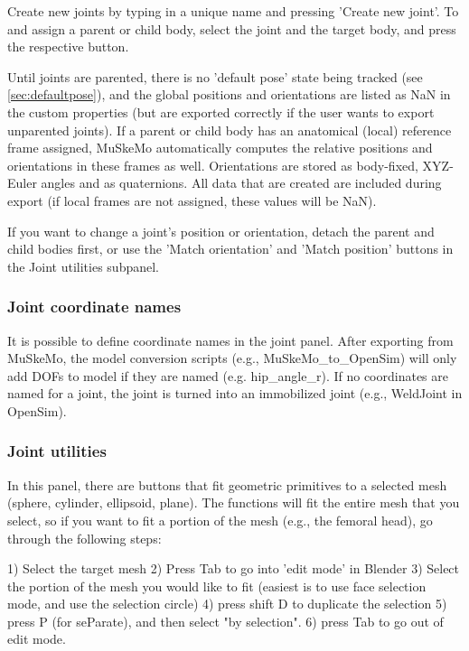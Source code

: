 \documentclass{article}
\begin{document}
Create new joints by typing in a unique name and pressing 'Create new joint'. To and assign a parent or child body, select the joint and the target body, and press the respective button. 


Until joints are parented, there is no 'default pose' state being tracked (see \ref{sec:defaultpose}), and the global positions and orientations are listed as NaN in the custom properties (but are exported correctly if the user wants to export unparented joints). If a parent or child body has an anatomical (local) reference frame assigned, MuSkeMo automatically computes the relative positions and orientations in these frames as well. Orientations are stored as body-fixed, XYZ-Euler angles and as quaternions. All data that are created are included during export (if local frames are not assigned, these values will be NaN).

If you want to change a joint's position or orientation, detach the parent and child bodies first, or use the 'Match orientation' and 'Match position' buttons in the Joint utilities subpanel.

\subsubsection*{Joint coordinate names}

It is possible to define coordinate names in the joint panel. After exporting from MuSkeMo, the model conversion scripts (e.g., MuSkeMo\_to\_OpenSim) will only add DOFs to model if they are named (e.g. hip\_angle\_r). If no coordinates are named for a joint, the joint is turned into an immobilized joint (e.g., WeldJoint in OpenSim). 

\subsubsection*{Joint utilities}

In this panel, there are buttons that fit geometric primitives to a selected mesh (sphere, cylinder, ellipsoid, plane). The functions will fit the entire mesh that you select, so if you want to fit a portion of the mesh (e.g., the femoral head), go through the following steps:

1) Select the target mesh
2) Press Tab to go into 'edit mode' in Blender
3) Select the portion of the mesh you would like to fit (easiest is to use face selection mode, and use the selection circle)
4) press shift \+ D to duplicate the selection
5) press P (for seParate), and then select "by selection".
6) press Tab to go out of edit mode.
\end{document}
